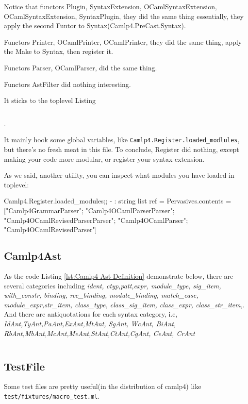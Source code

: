 \inputminted[fontsize=\scriptsize,
]{ocaml}{camlp4/code/Register.ml}

Notice that functors Plugin, SyntaxExtension, OCamlSyntaxExtension,
OCamlSyntaxExtension, SyntaxPlugin, they did the same thing
essentially, they apply the second Funtor to
Syntax(Camlp4.PreCast.Syntax).

Functors Printer, OCamlPrinter, OCamlPrinter, they did the same thing,
apply the Make to Syntax, then register it. 

Functors Parser, OCamlParser, did the same thing. 

Functors AstFilter  did nothing interesting.

It sticks to the toplevel Listing

\inputminted[fontsize=\scriptsize,
             firstline=123,
             lastline=126,
             ]{ocaml}{camlp4/code/Register.ml}.

It mainly hook some global variables, like
\verb|Camlp4.Register.loaded_modlules|, but there's no fresh meat in
this file.
To conclude, Register did nothing, except making your code more
modular, or register your syntax extension.

As we said, another utility, you can inspect what modules you have
loaded in toplevel:

\begin{ocamlcode}
Camlp4.Register.loaded_modules;;
- : string list ref =
{Pervasives.contents =
  ["Camlp4GrammarParser"; "Camlp4OCamlParserParser";
   "Camlp4OCamlRevisedParserParser"; "Camlp4OCamlParser";
   "Camlp4OCamlRevisedParser"]}
\end{ocamlcode}


\subsection{Camlp4Ast}

As the code Listing \ref{lst:Camlp4 Ast Definition} demonstrate below,
there are several categories including \textit{ident, ctyp,patt,expr,
  module\_type, sig\_item, with\_constr, binding, rec\_binding,
  module\_binding, match\_case, module\_expr,str\_item, class\_type,
  class\_sig\_item, class\_expr, class\_str\_item,}. And there are
antiquotations for each syntax category, i.e,
\textit{IdAnt,TyAnt,PaAnt,ExAnt,MtAnt, SgAnt, WcAnt, BiAnt,
  RbAnt,MbAnt,McAnt,MeAnt,StAnt,CtAnt,CgAnt, CeAnt, CrAnt}


\inputminted[fontsize=\scriptsize,
]{ocaml}{camlp4/code/ast/ast_def.ml}


\subsection{TestFile}
\label{sec:testfile}
Some test files are pretty useful(in the distribution of camlp4)
like \verb|test/fixtures/macro_test.ml|.
